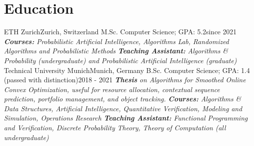 \documentclass[a4paper,20pt]{article}
\begin{document}
\section{Education}
  \resumeSubHeadingListStart
    \resumeSubheading
      {ETH Zurich}{Zurich, Switzerland}
      {M.Sc. Computer Science; GPA: 5.2}{since 2021}
      {\scriptsize \textit{ \footnotesize{\newline{}\textbf{Courses:} Probabilistic Artificial Intelligence, Algorithms Lab, Randomized Algorithms and Probabilistic Methods}
      \footnotesize{\newline{}\textbf{Teaching Assistant:} Algorithms \& Probability (undergraduate) and Probabilistic Artificial Intelligence (graduate)}}}
    \resumeSubHeadingListEnd
\vspace{-5pt}
  \resumeSubHeadingListStart
    \resumeSubheading
      {Technical University Munich}{Munich, Germany}
      {B.Sc. Computer Science; GPA: 1.4 (passed with distinction)}{2018 - 2021}
      {\scriptsize \textit{
      \footnotesize{\newline{}\textbf{Thesis} on Algorithms for Smoothed Online Convex Optimization, useful for resource allocation, contextual sequence prediction, portfolio management, and object tracking.} \footnotesize{\newline{}\textbf{Courses:} Algorithms \& Data Structures, Artificial Intelligence, Quantitative Verification, Modeling and Simulation, Operations Research}
      \footnotesize{\newline{}\textbf{Teaching Assistant:} Functional Programming and Verification, Discrete Probability Theory, Theory of Computation (all undergraduate)}}}
    \resumeSubHeadingListEnd

\vspace{-5pt}
\end{document}
